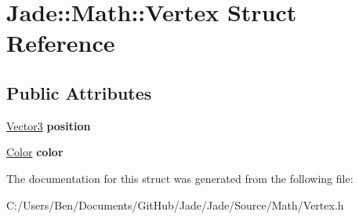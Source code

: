 \hypertarget{struct_jade_1_1_math_1_1_vertex}{}\section{Jade\+:\+:Math\+:\+:Vertex Struct Reference}
\label{struct_jade_1_1_math_1_1_vertex}
\subsection*{Public Attributes}
\begin{DoxyCompactItemize}
\item 
\hypertarget{struct_jade_1_1_math_1_1_vertex_a0dcd581ed4b39170c9bc8ab401c45cf1}{}\hyperlink{struct_jade_1_1_math_1_1_vector3}{Vector3} {\bfseries position}\label{struct_jade_1_1_math_1_1_vertex_a0dcd581ed4b39170c9bc8ab401c45cf1}

\item 
\hypertarget{struct_jade_1_1_math_1_1_vertex_a6577fccdd89457793491ebf80a2b5e3a}{}\hyperlink{struct_jade_1_1_math_1_1_color}{Color} {\bfseries color}\label{struct_jade_1_1_math_1_1_vertex_a6577fccdd89457793491ebf80a2b5e3a}

\end{DoxyCompactItemize}


The documentation for this struct was generated from the following file\+:\begin{DoxyCompactItemize}
\item 
C\+:/\+Users/\+Ben/\+Documents/\+Git\+Hub/\+Jade/\+Jade/\+Source/\+Math/Vertex.\+h\end{DoxyCompactItemize}

